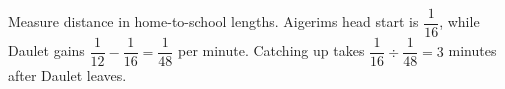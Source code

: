 Measure distance in home-to-school lengths. Aigerim\textquotesingle s head start is $\dfrac{1}{16}$, while Daulet gains $\dfrac{1}{12}-\dfrac{1}{16}=\dfrac{1}{48}$ per minute. Catching up takes $\dfrac{1}{16}\div\dfrac{1}{48}=\boxed3$ minutes after Daulet leaves.
